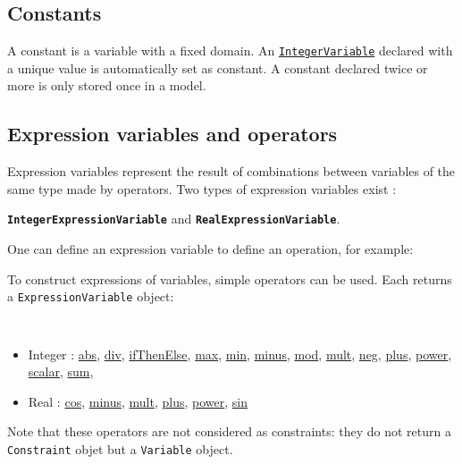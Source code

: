 \subsection{Constants}\label{model:constants}\hypertarget{model:constants}{}
A constant is a variable with a fixed domain. An \hyperlink{integervariable}{\tt IntegerVariable} declared with a unique value is automatically set as constant. A constant declared twice or more is only stored once in a model.



\subsection{Expression variables and operators}\label{model:expressionvariables}\hypertarget{model:expressionvariables}{}
Expression variables represent the result of combinations between variables of the same type made by operators. Two types of expression variables exist : 
\begin{notedef}
\textbf{\tt IntegerExpressionVariable} and \textbf{\tt RealExpressionVariable}.
\end{notedef}
One can define an expression variable to define an operation, for example:



To construct expressions of variables, simple operators can be used. Each returns a \texttt{ExpressionVariable} object:
\begin{notedef}\tt
\begin{itemize}
\item Integer : \hyperlink{abs:absoperator}{abs}, \hyperlink{div:divoperator}{div}, \hyperlink{ifthenelse:ifthenelseoperator}{ifThenElse}, \hyperlink{max:maxoperator}{max}, \hyperlink{min:minoperator}{min}, \hyperlink{minus:minusoperator}{minus}, \hyperlink{mod:modoperator}{mod}, \hyperlink{mult:multoperator}{mult}, \hyperlink{neg:negoperator}{neg}, \hyperlink{plus:plusoperator}{plus}, \hyperlink{power:poweroperator}{power}, \hyperlink{scalar:scalaroperator}{scalar}, \hyperlink{sum:sumoperator}{sum},
\item Real : \hyperlink{cos:cosoperator}{cos}, \hyperlink{minus:minusoperator}{minus}, \hyperlink{mult:multoperator}{mult}, \hyperlink{plus:plusoperator}{plus}, \hyperlink{power:poweroperator}{power}, \hyperlink{sin:sinoperator}{sin}
\end{itemize}
\end{notedef}
Note that these operators are not considered as constraints: they do not return a \texttt{Constraint} objet but a \texttt{Variable} object.

